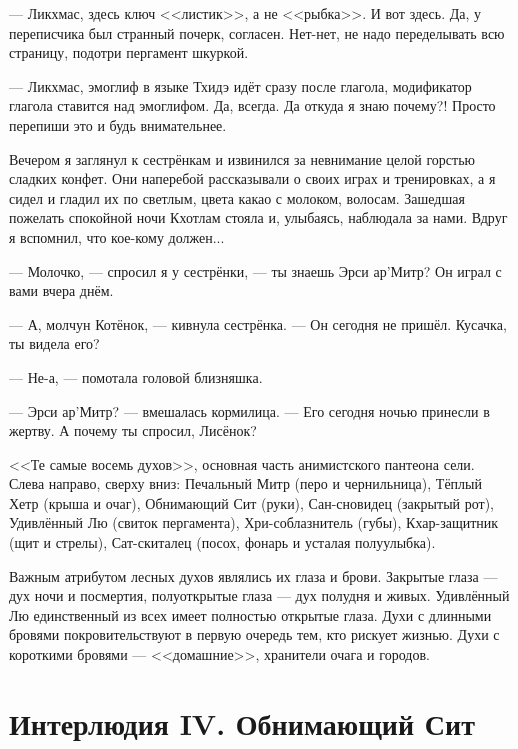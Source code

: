 --- Ликхмас, здесь ключ <<листик>>, а не <<рыбка>>.
И вот здесь.
Да, у переписчика был странный почерк, согласен.
Нет-нет, не надо переделывать всю страницу, подотри пергамент шкуркой.

--- Ликхмас, эмоглиф в языке Тхидэ идёт сразу после глагола, модификатор глагола ставится над эмоглифом.
Да, всегда.
Да откуда я знаю почему?!
Просто перепиши это и будь внимательнее.

Вечером я заглянул к сестрёнкам и извинился за невнимание целой горстью сладких конфет.
Они наперебой рассказывали о своих играх и тренировках, а я сидел и гладил их по светлым, цвета какао с молоком, волосам.
Зашедшая пожелать спокойной ночи Кхотлам стояла и, улыбаясь, наблюдала за нами.
Вдруг я вспомнил, что кое-кому должен...

--- Молочко, --- спросил я у сестрёнки, --- ты знаешь Эрси ар’Митр?
Он играл с вами вчера днём.

--- А, молчун Котёнок, --- кивнула сестрёнка.
--- Он сегодня не пришёл.
Кусачка, ты видела его?

--- Не-а, --- помотала головой близняшка.

--- Эрси ар’Митр? --- вмешалась кормилица.
--- Его сегодня ночью принесли в жертву.
А почему ты спросил, Лисёнок?


\newpage
\thispagestyle{plain}

<<Те самые восемь духов>>, основная часть анимистского пантеона сели.
Слева направо, сверху вниз: Печальный Митр (перо и чернильница), Тёплый Хетр (крыша и очаг), Обнимающий Сит (руки), Сан-сновидец (закрытый рот), Удивлённый Лю (свиток пергамента), Хри-соблазнитель (губы), Кхар-защитник (щит и стрелы), Сат-скиталец (посох, фонарь и усталая полуулыбка).

Важным атрибутом лесных духов являлись их глаза и брови.
Закрытые глаза --- дух ночи и посмертия, полуоткрытые глаза --- дух полудня и живых.
Удивлённый Лю единственный из всех имеет полностью открытые глаза.
Духи с длинными бровями покровительствуют в первую очередь тем, кто рискует жизнью.
Духи с короткими бровями --- <<домашние>>, хранители очага и городов.
\newpage

\chapter*{Интерлюдия IV. Обнимающий Сит}

